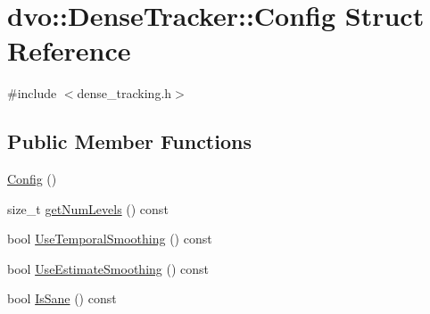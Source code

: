 \hypertarget{structdvo_1_1_dense_tracker_1_1_config}{}\section{dvo\+:\+:Dense\+Tracker\+:\+:Config Struct Reference}
\label{structdvo_1_1_dense_tracker_1_1_config}


{\ttfamily \#include $<$dense\+\_\+tracking.\+h$>$}

\subsection*{Public Member Functions}
\begin{DoxyCompactItemize}
\item 
\mbox{\hyperlink{structdvo_1_1_dense_tracker_1_1_config_af31c5a1d23a1516b2dd2a144f9593dc3}{Config}} ()
\item 
size\+\_\+t \mbox{\hyperlink{structdvo_1_1_dense_tracker_1_1_config_a45695687943199e6a16004986f96b479}{get\+Num\+Levels}} () const
\item 
bool \mbox{\hyperlink{structdvo_1_1_dense_tracker_1_1_config_a4530028334aa41483d8c3df3a92e7890}{Use\+Temporal\+Smoothing}} () const
\item 
bool \mbox{\hyperlink{structdvo_1_1_dense_tracker_1_1_config_a5aaf59dfe2495c19cbe6e759cc35f1b5}{Use\+Estimate\+Smoothing}} () const
\item 
bool \mbox{\hyperlink{structdvo_1_1_dense_tracker_1_1_config_a7a4028e633393e3bc45c3637aba924d4}{Is\+Sane}} () const
\end{DoxyCompactItemize}
